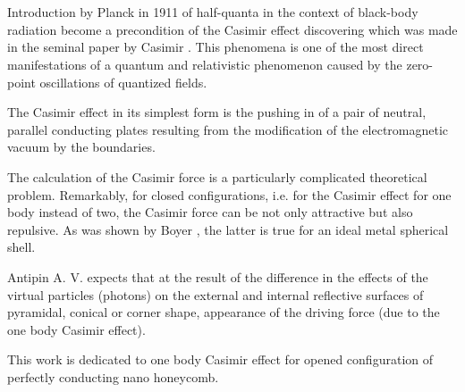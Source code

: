 \documentclass[twoside, 10pt]{article}
\begin{document}
\begin{multicols}{2}

    \section*{}\label{introduction}
\vspace{-3.5mm}

Introduction by Planck in 1911 of half-quanta in the context of
black-body radiation become a precondition of the Casimir effect
discovering which was made in the seminal paper by Casimir
\cite{Casimir1948}. This phenomena is one of the most direct
manifestations of a quantum and relativistic phenomenon caused by the
zero-point oscillations of quantized fields.

The Casimir effect in its simplest form is the pushing in of a pair of
neutral, parallel conducting plates resulting from the modification of
the electromagnetic vacuum by the boundaries.

The calculation of the Casimir force is a particularly complicated
theoretical problem. Remarkably, for closed configurations, i.e. for the
Casimir effect for one body instead of two, the Casimir force can be not
only attractive but also repulsive. As was shown by Boyer
\cite{Boyer1968}, the latter is true for an ideal metal spherical shell.

Antipin A. V. \cite{Antipin2012} expects that at the result of the
difference in the effects of the virtual particles (photons) on the
external and internal reflective surfaces of pyramidal, conical or
corner shape, appearance of the driving force (due to the one body
Casimir effect).

This work is dedicated to one body Casimir effect for opened
configuration of perfectly conducting nano honeycomb.



    \section*{}\label{two-dimensional-casimirs-approach}
\vspace{-3.5mm}


\end{multicols}
\end{document}
